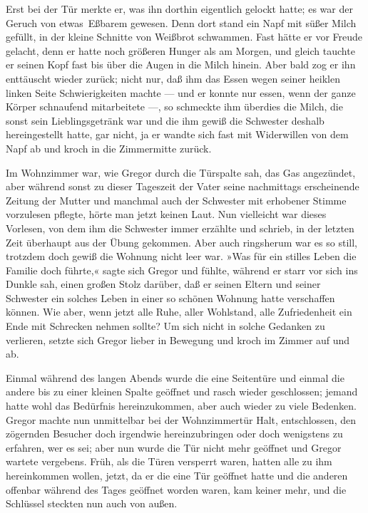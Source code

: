 Erst bei der Tür merkte er, was ihn dorthin eigentlich gelockt hatte; es
war der Geruch von etwas\est\ Eßbarem gewesen. Denn dort stand ein Napf mit
süßer Milch gefüllt, in der kleine Schnitte von Weißbrot schwammen. Fast
hätte er vor Freude gelacht, denn er hatte noch größeren Hunger als am
Morgen, und gleich tauchte er seinen Kopf fast bis über die Augen in die
Milch hinein. Aber bald zog er ihn enttäuscht wieder zurück; nicht nur,
daß ihm das Essen wegen seiner heiklen linken Seite Schwierigkeiten
machte --- und er konnte nur essen, wenn der ganze Körper schnaufend
mitarbeitete ---, so schmeckte ihm überdies die Milch, die sonst sein
Lieblingsgetränk war und die ihm gewiß die Schwester deshalb
hereingestellt hatte, gar nicht, ja er wandte sich fast mit Widerwillen
von dem Napf ab und kroch in die Zimmermitte zurück.

Im Wohnzimmer war, wie Gregor durch die Türspalte sah, das Gas
angezündet, aber während sonst zu dieser Tageszeit der Vater seine
nachmittags erscheinende Zeitung der Mutter und manchmal auch der
Schwester mit erhobener Stimme vorzulesen pflegte, hörte man jetzt
keinen Laut. Nun vielleicht war dieses Vorlesen, von dem ihm die
Schwester immer erzählte und schrieb, in der letzten Zeit überhaupt aus
der Übung gekommen. Aber auch ringsherum war es so still, trotzdem doch
gewiß die Wohnung nicht leer war. »Was für ein stilles Leben die Familie
doch führte,« sagte sich Gregor und fühlte, während er starr vor sich
ins Dunkle sah, einen großen Stolz darüber, daß er seinen Eltern und
seiner Schwester ein solches Leben in einer so schönen Wohnung hatte
verschaffen können. Wie aber, wenn jetzt alle Ruhe, aller Wohlstand,
alle Zufriedenheit ein Ende mit Schrecken nehmen sollte? Um sich nicht
in solche Gedanken zu verlieren, setzte sich Gregor lieber in Bewegung
und kroch im Zimmer auf und ab.

Einmal während des langen Abends wurde die eine Seitentüre und einmal
die andere bis zu einer kleinen Spalte geöffnet und rasch wieder
geschlossen; jemand hatte wohl das Bedürfnis hereinzukommen, aber auch
wieder zu viele Bedenken. Gregor machte nun unmittelbar bei der
Wohnzimmertür Halt, entschlossen, den zögernden Besucher doch irgendwie
hereinzubringen oder doch wenigstens zu erfahren, wer es sei; aber nun
wurde die Tür nicht mehr geöffnet und Gregor wartete vergebens. Früh,
als die Türen versperrt waren, hatten alle zu ihm hereinkommen wollen,
jetzt, da er die eine Tür geöffnet hatte und die anderen offenbar
während des Tages geöffnet worden waren, kam keiner mehr, und die
Schlüssel steckten nun auch von außen.

